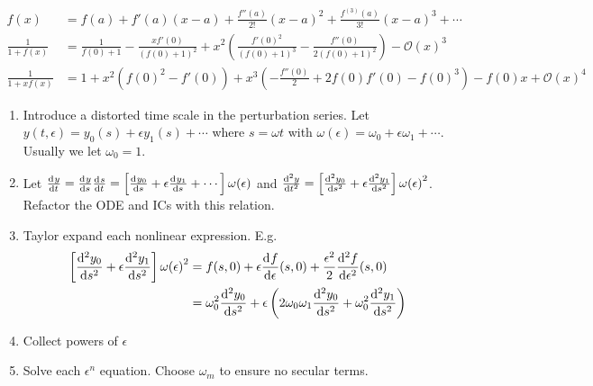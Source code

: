 \item[Taylor Series]
  {\tiny
    \begin{align*}
      f(x) &= f(a)+f'(a)(x-a)+\frac{f''(a)}{2!}{(x-a)}^2+\frac{f^{(3)}(a)}{3!}{(x-a)}^3+\cdots \\
      \frac{1}{1+f(x)} &= \frac{1}{{f(0)}+1}-\frac{x f'(0)}{{(f(0)+1)}^2}+x^2
                         \left(\frac{{f'(0)}^2}{{(f(0)+1)}^3}-\frac{f''(0)}{2 {(f(0)+1)}^2}\right)- {\mathcal{O}(x)}^3 \\
      \frac{1}{1+x f(x)} &= 1 + x^2 \left({f(0)}^2-f'(0)\right)+x^3
                           \left(-\frac{f''(0)}{2}+2 f(0) f'(0)-{f(0)}^3\right)-f(0) x + {\mathcal{O}(x)}^4
    \end{align*}
  }
\item[Poincar\'e-Lindstedt Method] \hfill
  \begin{enumerate}
  \item Introduce a distorted time scale in the perturbation series. Let
    $y(t,\epsilon)=y_0(s) + \epsilon y_1(s) + \cdots$ where $s=\omega t$ with
    $\omega(\epsilon) = \omega_0 + \epsilon\omega_1 + \cdots$. Usually we let
    $\omega_0=1$.
  \item Let $\od{y}{t}=\od{y}{s}\od{s}{t}=\left[\od{y_0}{s} +
      \epsilon\od{y_1}{s} + \cdots\right] \omega(\epsilon)$ and
    $\od[2]{y}{t}=\left[\od[2]{y_0}{s} +
      \epsilon\od[2]{y_1}{s}\right]{\omega(\epsilon)}^2$. Refactor the ODE and
    ICs with this relation.
  \item Taylor expand each nonlinear expression. E.g.
    \begin{align*}
      \left[ \od[2]{y_0}{s}+\epsilon\od[2]{y_1}{s} \right]{\omega(\epsilon)}^2
      &= f(s,0)+\epsilon\od{f}{\epsilon}(s,0) +
        \frac{\epsilon^2}{2}\od[2]{f}{\epsilon}(s,0) \\
      &= \omega_0^2 \od[2]{y_0}{s} + \epsilon\left(2\omega_0\omega_1\od[2]{y_0}{s} +
        \omega_0^2\od[2]{y_1}{s}\right) \
    \end{align*}
  \item Collect powers of $\epsilon$
  \item Solve each $\epsilon^n$ equation. Choose $\omega_m$ to ensure no secular
    terms.
  \end{enumerate}

